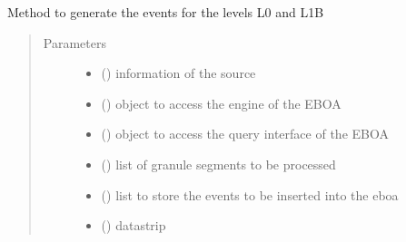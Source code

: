 \begin{fulllineitems}
\label{\detokenize{s2boa.ingestions:s2boa.ingestions.functions.L0_L1A_L1B_processing}}
\sphinxAtStartPar
Method to generate the events for the levels L0 and L1B
\begin{quote}\begin{description}
\item[{Parameters}] \leavevmode\begin{itemize}
\item {} 
\sphinxAtStartPar
{} () \textendash{} information of the source

\item {} 
\sphinxAtStartPar
{} () \textendash{} object to access the engine of the EBOA

\item {} 
\sphinxAtStartPar
{} () \textendash{} object to access the query interface of the EBOA

\item {} 
\sphinxAtStartPar
{} () \textendash{} list of granule segments to be processed

\item {} 
\sphinxAtStartPar
{} () \textendash{} list to store the events to be inserted into the eboa

\item {} 
\sphinxAtStartPar
{} () \textendash{} datastrip


\end{itemize}
\end{description}
\end{quote}
\end{fulllineitems}
